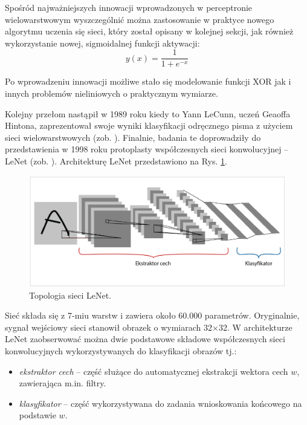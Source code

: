 Spośród najważniejszych innowacji wprowadzonych w perceptronie wielowarstwowym wyszczególnić można zastosowanie w praktyce nowego algorytmu uczenia się sieci, który został opisany w kolejnej sekcji, jak również wykorzystanie nowej, sigmoidalnej funkcji aktywacji:
\begin{equation}
\label{eqSigActFunc}
y(x) = \frac{1}{1 + e^{-x}}
\end{equation}

Po wprowadzeniu innowacji możliwe stało się modelowanie funkcji XOR jak i innych problemów nieliniowych o praktycznym wymiarze. 

Kolejny przełom nastąpił w 1989 roku kiedy to Yann LeCunn, uczeń Geaoffa Hintona, zaprezentował swoje wyniki klasyfikacji odręcznego pisma z użyciem sieci wielowarstwowych (zob. \cite{NIPS1989_293}). Finalnie, badania te doprowadziły do przedstawienia w 1998 roku protoplasty współczesnych sieci konwolucyjnej -- LeNet (zob. \cite{Lecun1998}). Architekturę LeNet przedstawiono na Rys. \ref{LeNet}.
\begin{figure}[h!]
	\centering
	\includegraphics[width=1\textwidth]{figures/lenet.png}
	\caption{Topologia sieci LeNet.}
	\label{LeNet}
\end{figure}

Sieć składa się z 7-miu warstw i zawiera około 60.000 parametrów. Oryginalnie, sygnał wejściowy sieci stanowił obrazek o wymiarach 32$\times$32. W architekturze LeNet zaobserwować można dwie podstawowe składowe współczesnych sieci konwolucyjnych wykorzystywanych do klasyfikacji obrazów tj.:
\begin{itemize}[noitemsep,nolistsep]
	\item \textit{ekstraktor cech} -- część służące do automatycznej ekstrakcji wektora cech $w$, zawierająca m.in. filtry.
	\item \textit{klasyfikator} -- część wykorzystywana do zadania wnioskowania końcowego na podstawie $w$.
\end{itemize}  

